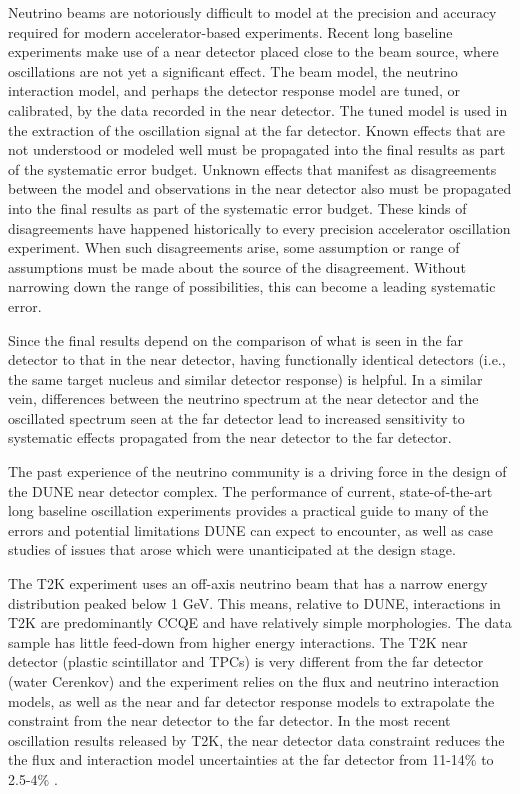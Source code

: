 Neutrino beams are notoriously difficult to model at the precision and accuracy required for modern accelerator-based experiments.  Recent long baseline experiments make use of a near detector placed close to the beam source, where oscillations are not yet a significant effect.  The beam model, the neutrino interaction model, and perhaps the detector response model are tuned, or calibrated, by the data recorded in the near detector. The tuned model is used in the extraction of the oscillation signal at the far detector. Known effects that are not understood or modeled well must be propagated into the final results as part of the systematic error budget.  Unknown effects that manifest as disagreements between the model and observations in the near detector also must be propagated into the final results as part of the systematic error budget.  These kinds of disagreements have happened historically to every precision accelerator oscillation experiment.  When such disagreements arise, some assumption or range of assumptions must be made about the      source of the disagreement.  Without narrowing down the range of possibilities, this can become a leading systematic error.



Since the final results depend on the comparison of what is seen in the far detector to that in the near detector, having functionally identical detectors (i.e., the same target nucleus and similar detector response) is helpful.  In a similar vein, differences between the neutrino spectrum at the near detector and the oscillated spectrum seen at the far detector lead to increased sensitivity to systematic effects propagated from the near detector to the far detector.

The past experience of the neutrino community is a driving force in the design of the DUNE near detector complex.
The performance of  current, state-of-the-art long baseline oscillation experiments  provides a practical guide to many of the errors and potential limitations DUNE can expect to encounter, as well as case studies of issues that arose which were unanticipated at the design stage. 

The T2K experiment uses an off-axis neutrino beam that has a narrow energy distribution peaked below 1 GeV. This means, relative to DUNE, interactions in T2K are predominantly CCQE and have relatively simple morphologies.  The data sample has little feed-down from higher energy interactions.  The T2K near detector (plastic scintillator and TPCs) is very different from the far detector (water Cerenkov) and the experiment relies on the flux and neutrino interaction models, as well as the near and far detector response models to extrapolate the constraint from the near detector to the far detector.  In the most recent oscillation results released by T2K, the near detector data constraint reduces the the flux and interaction model uncertainties at the far detector from 11-14\% to 2.5-4\% \cite{Abe:2018wpn}.

